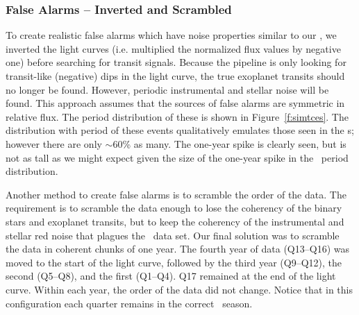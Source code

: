 \subsubsection{False Alarms -- Inverted and Scrambled} 

To create realistic false alarms which have noise properties similar to our , we inverted the light curves (i.e. multiplied the normalized flux values by negative one) before searching for transit signals. Because the pipeline is only looking for transit-like (negative) dips in the light curve, the true exoplanet transits should no longer be found. However, periodic instrumental and stellar noise will be found. This approach assumes that the sources of false alarms are symmetric in relative flux. The period distribution of these  is shown in Figure~\ref{f:simtces}. The distribution with period of these events qualitatively emulates those seen in the \opstce s; however there are only $\sim$60\% as many. The one-year spike is clearly seen, but is not as tall as we might expect given the size of the one-year spike in the \opstce\ period distribution. 

Another method to create false alarms is to scramble the order of the data. The requirement is to scramble the data enough to lose the coherency of the binary stars and exoplanet transits, but to keep the coherency of the instrumental and stellar red noise that plagues the \Kepler\ data set. Our final solution was to scramble the data in coherent chunks of one year. The fourth year of data (Q13--Q16) was moved to the start of the light curve, followed by the third year (Q9--Q12), the second (Q5--Q8), and the first (Q1--Q4). Q17 remained at the end of the light curve. Within each year, the order of the data did not change. Notice that in this configuration each quarter remains in the correct \Kepler\ season.

